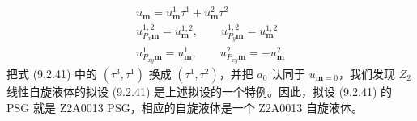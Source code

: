 
\begin{equation*}
\begin{array}{l}
u_{\pmb{m}}=u_{\pmb{m}}^{1}\tau^{1}+u_{\pmb{m}}^{2}\tau^{2}\\[2pt]
u_{P_{x}\pmb{m}}^{1,2}=u_{\pmb{m}}^{1,2},\qquad u_{P_{y}\pmb{m}}^{1,2}=u_{\pmb{m}}^{1,2}\\[2pt]
u_{P_{xy}\pmb{m}}^{1}=u_{\pmb{m}}^{1},\qquad u_{P_{xy}\pmb{m}}^{2}=-u_{\pmb{m}}^{2}
\end{array}
\end{equation*}
把式 (9.2.41) 中的 $(\tau^{3},\tau^{1})$ 换成 $(\tau^{1},\tau^{2})$，并把 $a_{0}$ 认同于 $u_{\pmb{m}=0}$，我们发现 $Z_{2}$ 线性自旋液体的拟设 (9.2.41) 是上述拟设的一个特例。因此，拟设 (9.2.41) 的 PSG 就是 Z2A0013 PSG，相应的自旋液体是一个 Z2A0013 自旋液体。

